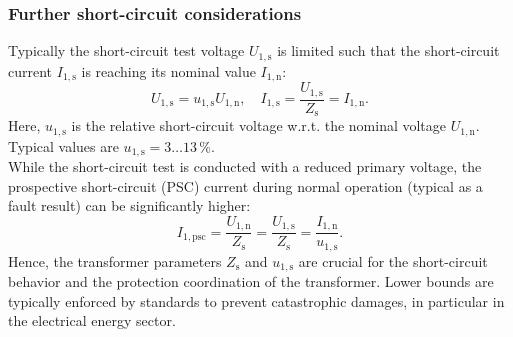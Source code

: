 \begin{frame}
	\frametitle{Further short-circuit considerations}
	Typically the short-circuit test voltage $U_{1,\mathrm{s}}$ is limited such that the short-circuit current $I_{1,\mathrm{s}}$ is reaching its nominal value $I_{1,\mathrm{n}}$:
	\begin{equation}
		U_{1,\mathrm{s}} = u_{1,\mathrm{s}} U_{1,\mathrm{n}}, \quad I_{1,\mathrm{s}} = \frac{U_{1,\mathrm{s}}}{Z_\mathrm{s}} = I_{1,\mathrm{n}}.
	\end{equation}
	Here, $u_{1,\mathrm{s}}$ is the relative short-circuit voltage w.r.t. the nominal voltage $U_{1,\mathrm{n}}$. \pause Typical values are $u_{1,\mathrm{s}} = 3 \ldots 13 \, \%.$ \pause
	\\[1em]
	While the short-circuit test is conducted with a reduced primary voltage, the prospective short-circuit (PSC) current during normal operation (typical as a fault result) can be significantly higher:
	\begin{equation}
		I_{1,\mathrm{psc}} = \frac{U_{1,\mathrm{n}}}{Z_\mathrm{s}} = \frac{U_{1,\mathrm{s}}}{Z_\mathrm{s}} = \frac{I_{1,\mathrm{n}}}{u_{1,\mathrm{s}}}.
	\end{equation}  \pause
	Hence, the transformer parameters $Z_\mathrm{s}$ and $u_{1,\mathrm{s}}$ are crucial for the short-circuit behavior and the protection coordination of the transformer. Lower bounds are typically enforced by standards to prevent catastrophic damages, in particular in the electrical energy sector.
\end{frame}


